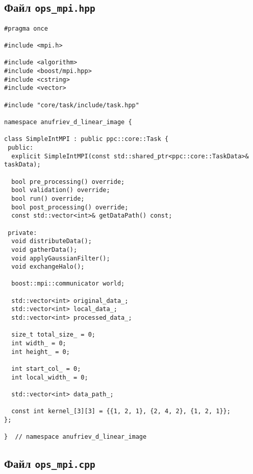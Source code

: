 \documentclass[12pt]{article}
\begin{document}
\subsection*{Файл \texttt{ops\_mpi.hpp}}

\begin{lstlisting}
#pragma once

#include <mpi.h>

#include <algorithm>
#include <boost/mpi.hpp>
#include <cstring>
#include <vector>

#include "core/task/include/task.hpp"

namespace anufriev_d_linear_image {

class SimpleIntMPI : public ppc::core::Task {
 public:
  explicit SimpleIntMPI(const std::shared_ptr<ppc::core::TaskData>& taskData);

  bool pre_processing() override;
  bool validation() override;
  bool run() override;
  bool post_processing() override;
  const std::vector<int>& getDataPath() const;

 private:
  void distributeData();
  void gatherData();
  void applyGaussianFilter();
  void exchangeHalo();

  boost::mpi::communicator world;

  std::vector<int> original_data_;
  std::vector<int> local_data_;
  std::vector<int> processed_data_;

  size_t total_size_ = 0;
  int width_ = 0;
  int height_ = 0;

  int start_col_ = 0;
  int local_width_ = 0;

  std::vector<int> data_path_;

  const int kernel_[3][3] = {{1, 2, 1}, {2, 4, 2}, {1, 2, 1}};
};

}  // namespace anufriev_d_linear_image
\end{lstlisting}

\subsection*{Файл \texttt{ops\_mpi.cpp}}
\end{document}
